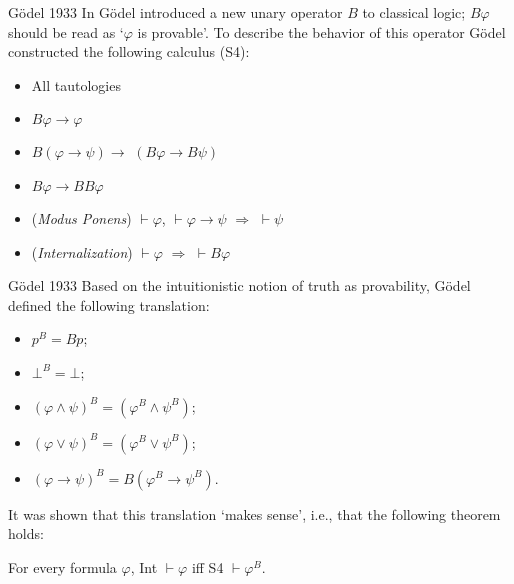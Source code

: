 \documentclass{beamer}
\theoremstyle{definition}
\newcommand{\e}{\wedge}
\newcommand{\ou}{\vee}
\newcommand{\impli}{\rightarrow}
\newcommand{\teo}{\vdash}
\begin{document}
\begin{frame} {Gödel 1933}
\qquad In \cite{Goedel33} Gödel introduced a new unary operator $B$ to classical logic; $B\varphi$ should be read as `$\varphi$ is provable'. To describe the behavior of this operator Gödel constructed the following calculus (S4):

\vspace{5mm}

\begin{itemize}
 \item[] All tautologies
 \item[] $B\varphi \impli \varphi$
 \item[] $B(\varphi \impli \psi) \impli$ $(B\varphi \impli B\psi)$
 \item[] $B\varphi \impli BB\varphi$
 \item[] (\textit{Modus Ponens}) $\teo \varphi$, $\teo \varphi\impli\psi$ $\Rightarrow$ $\teo \psi$
 \item[] (\textit{Internalization})  $\teo \varphi$ $\Rightarrow$ $\teo B\varphi$
\end{itemize}
\end{frame}

\begin{frame} {Gödel 1933}
\qquad Based on the intuitionistic notion of truth as provability, Gödel defined the following translation:

\begin{itemize}
	\item $p^{B} = Bp$;
	\item $\bot^{B} = \bot$;	
	\item $(\varphi \e \psi)^{B} = (\varphi^{B} \e \psi^{B})$;
	\item $(\varphi \ou \psi)^{B} = (\varphi^{B} \ou \psi^{B})$;	
	\item $(\varphi \impli \psi)^{B} = B(\varphi^{B} \impli \psi^{B})$.
\end{itemize}

\qquad It was shown that this translation `makes sense', i.e., that the following theorem holds:

\begin{center}
	For every formula $\varphi$, Int $\teo \varphi$ iff S4 $\teo \varphi^{B}$.
\end{center}
\end{frame}
\end{document}
